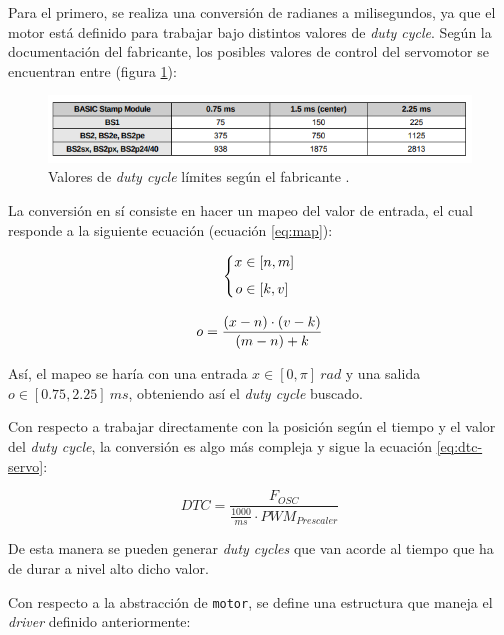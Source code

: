 Para el primero, se realiza una conversión de radianes a milisegundos, ya que el motor
está definido para trabajar bajo distintos valores de \textit{duty cycle}. Según la
documentación del fabricante, los posibles valores de control del servomotor se
encuentran entre (figura \ref{fig:servo_dtc}):

\begin{figure}[H]
    \centering
    \includegraphics[width=.7\linewidth]{pictures/servo_duty_cycle.png}
    \caption{Valores de \textit{duty cycle} límites según el fabricante \cite{rs-online90000005ServomotorParallax}.}
    \label{fig:servo_dtc}
\end{figure}

La conversión en sí consiste en hacer un mapeo del valor de entrada, el cual responde
a la siguiente ecuación (ecuación \ref{eq:map}):

\begin{gather*}
    \left\{\begin{aligned}
        x & \in \left[n, m\right] \\[1ex]
        o & \in \left[k, v\right]    
    \end{aligned}\right. \notag \\[2ex]
    o = \frac{\left(x - n\right) \cdot \left(v - k\right)}{\left(m - n\right) + k} \\ \label{eq:map}
\end{gather*}

Así, el mapeo se haría con una entrada $x \in \left[0, \pi\right]~rad$ y una salida 
$o \in \left[0.75, 2.25\right]~ms$, obteniendo así el \textit{duty cycle} buscado.

Con respecto a trabajar directamente con la posición según el tiempo y el valor del
\textit{duty cycle}, la conversión es algo más compleja y sigue la ecuación \ref{eq:dtc-servo}:

\begin{equation}\label{eq:dtc-servo}
    DTC = \frac{F_{OSC}}{\frac{1000}{ms} \cdot PWM_{Prescaler}}
\end{equation}

De esta manera se pueden generar \textit{duty cycles} que van acorde al tiempo que
ha de durar a nivel alto dicho valor.

Con respecto a la abstracción de \texttt{motor}, se define una estructura que
maneja el \textit{driver} definido anteriormente:

